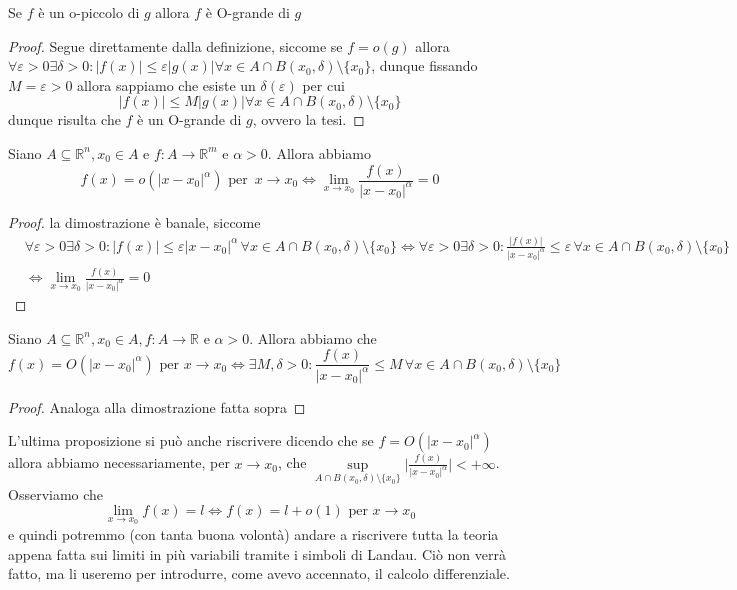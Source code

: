 \begin{exercise}
Se $f$ è un o-piccolo di $g$ allora $f$ è O-grande di $g$
\end{exercise}
\begin{proof}
Segue direttamente dalla definizione, siccome se $f = o(g)$ allora $\forall \varepsilon > 0 \exists \delta > 0: |f(x)| \leq \varepsilon |g(x)| \forall x \in A \cap B(x_0, \delta) \setminus \{ x_0 \}$, dunque fissando $M = \varepsilon > 0$ allora sappiamo che esiste un $\delta(\varepsilon)$ per cui
$$
|f(x)| \leq M |g(x)| \forall x \in A \cap B(x_0, \delta) \setminus \{ x_0 \}
$$ 
dunque risulta che $f$ è un O-grande di $g$, ovvero la tesi.
\end{proof}
\begin{prop}
Siano $A \subseteq \mathbb{R}^n, x_0 \in  A$ e $f: A \to \mathbb{R}^m$ e $\alpha > 0$. Allora abbiamo
$$
f(x) = o(|x-x_0|^\alpha) \text{ per } \, x \to x_0 \iff \lim_{x \to x_0} \frac{f(x)}{|x-x_0|^\alpha} = 0
$$
\end{prop}
\begin{proof}
la dimostrazione è banale, siccome 
\begin{align*}
&\forall \varepsilon > 0 \exists \delta > 0: |f(x)| \leq \varepsilon |x-x_0|^\alpha \, \forall x \in A \cap B(x_0, \delta) \setminus \{ x_0 \} \iff \forall \varepsilon > 0 \exists \delta > 0: \frac{|f(x)|}{|x-x_0|^\alpha} \leq \varepsilon \, \forall x \in A \cap B(x_0, \delta) \setminus \{ x_0 \} \\ &\iff \lim_{x \to x_0} \frac{f(x)}{|x-x_0|^\alpha} = 0
\end{align*}
\end{proof}
\begin{prop}
Siano $A \subseteq \mathbb{R}^n, x_0 \in A, f: A \to \mathbb{R}$ e $\alpha > 0$. Allora abbiamo che $$f(x) = O(|x-x_0|^\alpha) \text{ per } x \to x_0 \iff \exists M, \delta > 0: \frac{f(x)}{|x-x_0|^\alpha} \leq M \, \forall x \in A \cap B(x_0, \delta) \setminus \{ x_0 \}$$
\end{prop}
\begin{proof}
Analoga alla dimostrazione fatta sopra
\end{proof}
\noindent L'ultima proposizione si può anche riscrivere dicendo che se $f=O(|x-x_0|^\alpha)$ allora abbiamo necessariamente, per $x \to x_0$, che $\sup\limits_{A \cap B(x_0, \delta) \setminus \{ x_0 \}} \Bigg| \frac{f(x)}{|x-x_0|^{\alpha}} \Bigg| < +\infty$. \\
Osserviamo che
$$
\lim_{x \to x_0} f(x) = l \iff f(x) = l + o(1) \text{ per } x \to x_0
$$
e quindi potremmo (con tanta buona volontà) andare a riscrivere tutta la teoria appena fatta sui limiti in più variabili tramite i simboli di Landau. Ciò non verrà fatto, ma li useremo per introdurre, come avevo accennato, il calcolo differenziale.
